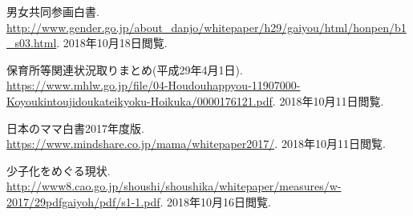 \documentclass[a4j]{jarticle}
\begin{document}
\begin{thebibliography}{3}
  男女共同参画白書.\\
  \url{http://www.gender.go.jp/about_danjo/whitepaper/h29/gaiyou/html/honpen/b1_s03.html}.
  \newblock 2018年10月18日閲覧.

  保育所等関連状況取りまとめ(平成29年4月1日).\\
  \url{https://www.mhlw.go.jp/file/04-Houdouhappyou-11907000-Koyoukintoujidoukateikyoku-Hoikuka/0000176121.pdf}.
  \newblock 2018年10月11日閲覧.

  日本のママ白書2017年度版.\\
  \url{https://www.mindshare.co.jp/mama/whitepaper2017/}.
  \newblock 2018年10月11日閲覧.

  少子化をめぐる現状.\\
  \url{http://www8.cao.go.jp/shoushi/shoushika/whitepaper/measures/w-2017/29pdfgaiyoh/pdf/s1-1.pdf}.
  \newblock 2018年10月16日閲覧.
\end{thebibliography}
\end{document}
